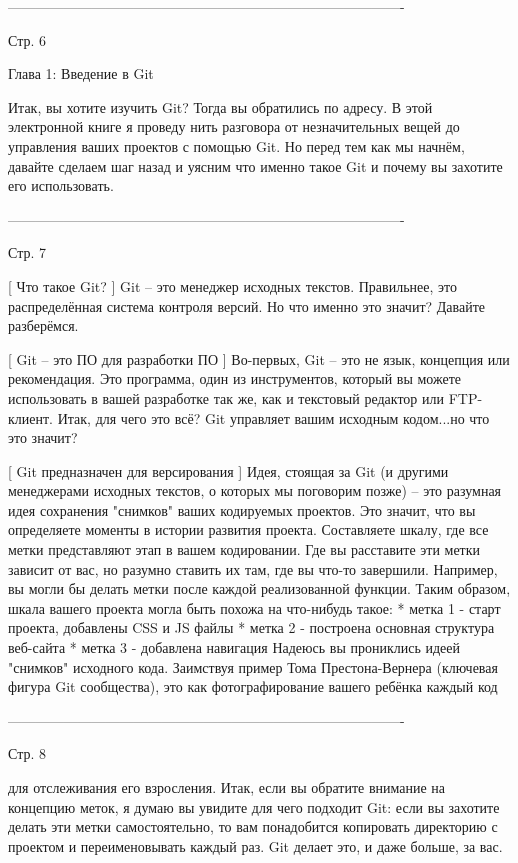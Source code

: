 -------------------------------------------------------------------------------------

Стр. 6

Глава 1: Введение в Git

Итак, вы хотите изучить Git? Тогда вы обратились по адресу. В этой электронной книге
я проведу нить разговора от незначительных вещей до управления ваших проектов с
помощью Git. Но перед тем как мы начнём, давайте сделаем шаг назад и уясним что
именно такое Git и почему вы захотите его использовать.

-------------------------------------------------------------------------------------

Стр. 7

[ Что такое Git? ]
Git -- это менеджер исходных текстов. Правильнее, это распределённая система
контроля версий. Но что именно это значит? Давайте разберёмся.

[ Git -- это ПО для разработки ПО ]
Во-первых, Git -- это не язык, концепция или рекомендация. Это программа, один из
инструментов, который вы можете использовать в вашей разработке так же, как и 
текстовый редактор или FTP-клиент. Итак, для чего это всё? Git управляет вашим 
исходным кодом...но что это значит?

[ Git предназначен для версирования ]
Идея, стоящая за Git (и другими менеджерами исходных текстов, о которых мы поговорим
позже) -- это разумная идея сохранения "снимков" ваших кодируемых проектов. Это 
значит, что вы определяете моменты в истории развития проекта. Составляете шкалу,
где все метки представляют этап в вашем кодировании. Где вы расставите эти метки
зависит от вас, но разумно ставить их там, где вы что-то завершили. Например, вы
могли бы делать метки после каждой реализованной функции. Таким образом, шкала
вашего проекта могла быть похожа на что-нибудь такое:
	* метка 1 - старт проекта, добавлены CSS и JS файлы
	* метка 2 - построена основная структура веб-сайта
	* метка 3 - добавлена навигация
Надеюсь вы прониклись идеей "снимков" исходного кода. Заимствуя пример Тома
Престона-Вернера (ключевая фигура Git сообщества), это как фотографирование вашего
ребёнка каждый код 

-------------------------------------------------------------------------------------

Стр. 8

для отслеживания его взросления. Итак, если вы обратите внимание
на концепцию меток, я думаю вы увидите для чего подходит Git: если вы захотите делать
эти метки самостоятельно, то вам понадобится копировать директорию с проектом и
переименовывать каждый раз. Git делает это, и даже больше, за вас.

